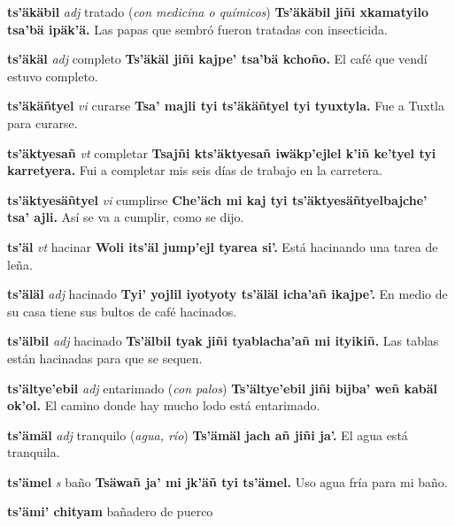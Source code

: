 \documentclass[10pt]{scrbook}
\newcommand{\entry}[1]{\textbf{#1}}
\newcommand{\partofspeech}[1]{\textit{#1}}
\newcommand{\spanishtranslation}[1]{#1}
\newcommand{\clarification}[1]{(\textit{#1})}
\newcommand{\cholexample}[1]{\textbf{#1}}
\newcommand{\exampletranslation}[1]{#1}
\begin{document}
\begin{multicols}{2}
\entry{ts'äkäbil}
\partofspeech{adj}
\spanishtranslation{tratado}
\clarification{con medicina o químicos}
\cholexample{Ts'äkäbil jiñi xkamatyilo tsa'bä ipäk'ä.}
\exampletranslation{Las papas que sembró fueron tratadas con insecticida.}

\entry{ts'äkäl}
\partofspeech{adj}
\spanishtranslation{completo}
\cholexample{Ts'äkäl jiñi kajpe' tsa'bä kchoño.}
\exampletranslation{El café que vendí estuvo completo.}

\entry{ts'äkäñtyel}
\partofspeech{vi}
\spanishtranslation{curarse}
\cholexample{Tsa' majli tyi ts'äkäñtyel tyi tyuxtyla.}
\exampletranslation{Fue a Tuxtla para curarse.}

\entry{ts'äktyesañ}
\partofspeech{vt}
\spanishtranslation{completar}
\cholexample{Tsajñi kts'äktyesañ iwäkp'ejlel k'iñ ke'tyel tyi karretyera.}
\exampletranslation{Fui a completar mis seis días de trabajo en la carretera.}

\entry{ts'äktyesäñtyel}
\partofspeech{vi}
\spanishtranslation{cumplirse}
\cholexample{Che'äch mi kaj tyi ts'äktyesäñtyelbajche' tsa' ajli.}
\exampletranslation{Así se va a cumplir, como se dijo.}

\entry{ts'äl}
\partofspeech{vt}
\spanishtranslation{hacinar}
\cholexample{Woli its'äl jump'ejl tyarea si'.}
\exampletranslation{Está hacinando una tarea de leña.}

\entry{ts'äläl}
\partofspeech{adj}
\spanishtranslation{hacinado}
\cholexample{Tyi' yojlil iyotyoty ts'äläl icha'añ ikajpe'.}
\exampletranslation{En medio de su casa tiene sus bultos de café hacinados.}

\entry{ts'älbil}
\partofspeech{adj}
\spanishtranslation{hacinado}
\cholexample{Ts'älbil tyak jiñi tyablacha'añ mi ityikiñ.}
\exampletranslation{Las tablas están hacinadas para que se sequen.}

\entry{ts'ältye'ebil}
\partofspeech{adj}
\spanishtranslation{entarimado}
\clarification{con palos}
\cholexample{Ts'ältye'ebil jiñi bijba' weñ kabäl ok'ol.}
\exampletranslation{El camino donde hay mucho lodo está entarimado.}

\entry{ts'ämäl}
\partofspeech{adj}
\spanishtranslation{tranquilo}
\clarification{agua, río}
\cholexample{Ts'ämäl jach añ jiñi ja'.}
\exampletranslation{El agua está tranquila.}

\entry{ts'ämel}
\partofspeech{s}
\spanishtranslation{baño}
\cholexample{Tsäwañ ja' mi jk'äñ tyi ts'ämel.}
\exampletranslation{Uso agua fría para mi baño.}

\entry{ts'ämi' chityam}
\spanishtranslation{bañadero de puerco}


\end{multicols}
\end{document}
